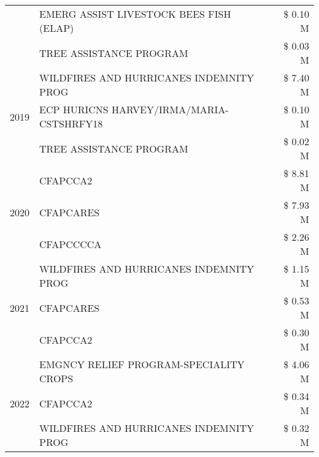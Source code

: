 \begin{tabular}{llr}
 & EMERG ASSIST LIVESTOCK BEES FISH (ELAP) & \$ 0.10 M \\
 & TREE ASSISTANCE PROGRAM & \$ 0.03 M \\
\cline{1-3}
\multirow[t]{3}{*}{2019} & WILDFIRES AND HURRICANES INDEMNITY PROG & \$ 7.40 M \\
 & ECP HURICNS HARVEY/IRMA/MARIA-CSTSHRFY18 & \$ 0.10 M \\
 & TREE ASSISTANCE PROGRAM & \$ 0.02 M \\
\cline{1-3}
\multirow[t]{3}{*}{2020} & CFAPCCA2 & \$ 8.81 M \\
 & CFAPCARES & \$ 7.93 M \\
 & CFAPCCCCA & \$ 2.26 M \\
\cline{1-3}
\multirow[t]{3}{*}{2021} & WILDFIRES AND HURRICANES INDEMNITY PROG & \$ 1.15 M \\
 & CFAPCARES & \$ 0.53 M \\
 & CFAPCCA2 & \$ 0.30 M \\
\cline{1-3}
\multirow[t]{3}{*}{2022} & EMGNCY RELIEF PROGRAM-SPECIALITY CROPS & \$ 4.06 M \\
 & CFAPCCA2 & \$ 0.34 M \\
 & WILDFIRES AND HURRICANES INDEMNITY PROG & \$ 0.32 M \\
\cline{1-3}
\bottomrule
\end{tabular}

